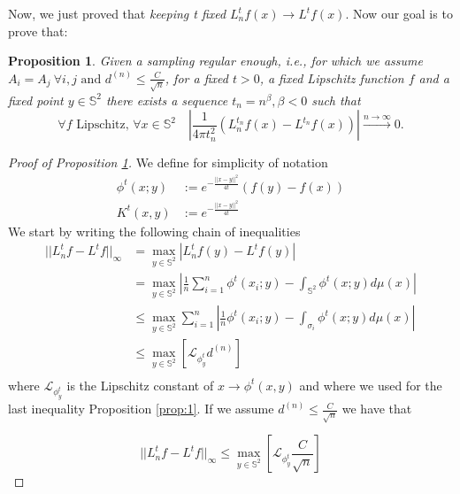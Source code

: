 \documentclass{article} %
\newtheorem{prop}{Proposition}
\begin{document}
Now, we just proved that \textit{keeping t fixed} $L_n^tf(x)\rightarrow L^tf(x)$. Now our goal is to prove that:

\vspace{0.5cm}
\begin{prop}\label{prop:2}
	Given a sampling regular enough, i.e., for which we assume $A_i=A_j \ \forall i,j\text{ and }d^{(n)}\leq \frac{C}{\sqrt{n}}$, for a fixed $t>0$, a fixed Lipschitz function $f$ and a fixed point $y\in\mathbb S^2$ there exists a sequence $t_n = n^\beta, \beta<0$ such that
$$
\forall f \text{ Lipschitz, } \forall x\in\mathbb S^2 \quad \left|\frac{1}{4\pi t_n^2}\left(L_n^{t_n}f(x) - L^{t_n}f(x)\right)\right|\xrightarrow{n\to \infty}0.
$$
\end{prop}
\vspace{0.5cm}

\begin{proof}[Proof of Proposition \ref{prop:2}]

We define for simplicity of notation
\begin{align}
	\phi^t(x;y) &:= e^{-\frac{||x-y||^2}{4t}}\left(f(y)-f(x)\right)\\
	K^t(x,y) &:=  e^{-\frac{||x-y||^2}{4t}}
\end{align}
We start by writing the following chain of inequalities
\begin{align*}
	||L_n^tf-L^tf||_\infty &= \max _{y\in \mathbb S^2} \left|L_n^tf(y)-L^tf(y)\right|\\
	&= \max _{y\in \mathbb S^2} \left| \frac{1}{n} \sum_{i=1}^n \phi^t(x_i; y)- \int_{\mathbb S^2} \phi^t(x;y)d\mu(x) \right|\\
	&\leq \max _{y\in \mathbb S^2}  \sum_{i=1}^n   \left| \frac{1}{n}  \phi^t(x_i; y)- \int_{\sigma_i} \phi^t(x;y)d\mu(x) \right|\\
	&\leq  \max _{y\in \mathbb S^2} \left[\mathcal L_{\phi^t_y}d^{(n)} \right]\\
\end{align*}
where $\mathcal L_{\phi^t_y}$ is the Lipschitz constant of $x \rightarrow \phi^t(x, y)$ and where we used for the last inequality Proposition \ref{prop:1}. If we assume $d^{(n)}\leq \frac{C}{\sqrt{n}}$ we have that

$$||L_n^tf-L^tf||_\infty  \leq  \max _{y\in \mathbb S^2} \left[ \mathcal L_{\phi^t_y} \frac{C}{\sqrt{n}} \right]$$


\end{proof}
\end{document}
